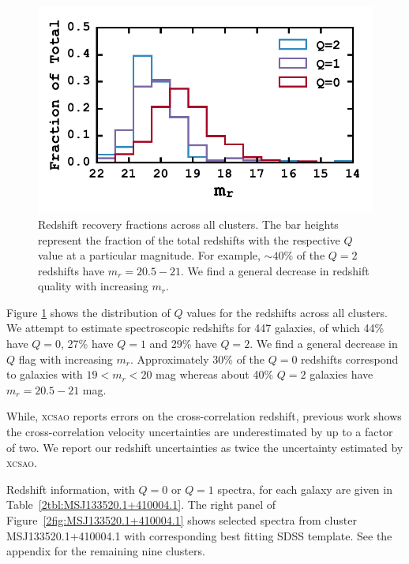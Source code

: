 \begin{figure}[t]
	\begin{center}
		\includegraphics[width=\textwidth]{figures2/redshiftHist.pdf}
	\end{center}
	\caption[Redshift recovery fractions across all clusters]{Redshift recovery fractions across all clusters. The bar heights represent the fraction of the total redshifts with the respective $Q$ value at a particular magnitude. For example, $\sim 40\%$ of the $Q=2$ redshifts have $m_r = 20.5-21$. We find a general decrease in redshift quality with increasing $m_r$. } 
	\label{2fig:redshiftHist} 
\end{figure}

Figure \ref{2fig:redshiftHist} shows the distribution of $Q$ values for the redshifts across all clusters. We attempt to estimate spectroscopic redshifts for 447 galaxies, of which 44\% have $Q=0$, 27\% have $Q=1$ and 29\% have $Q=2$.  We find a general decrease in $Q$ flag with increasing $m_r$. Approximately 30\% of the $Q=0$ redshifts correspond to galaxies with $19 < m_r <20$ mag whereas about 40\% $Q=2$ galaxies have $m_r = 20.5-21$ mag.

While, \textsc{xcsao} reports errors on the cross-correlation redshift, previous work  shows the cross-correlation velocity uncertainties are underestimated by up to a factor of two. We report our redshift uncertainties as twice the uncertainty estimated by \textsc{xcsao}.

Redshift information, with $Q=0$ or $Q=1$ spectra, for each galaxy are given in Table~\ref{2tbl:MSJ133520.1+410004.1}. The right panel of Figure~\ref{2fig:MSJ133520.1+410004.1} shows selected spectra from cluster MSJ133520.1+410004.1 with corresponding best fitting SDSS template. See the appendix for the remaining nine clusters.

